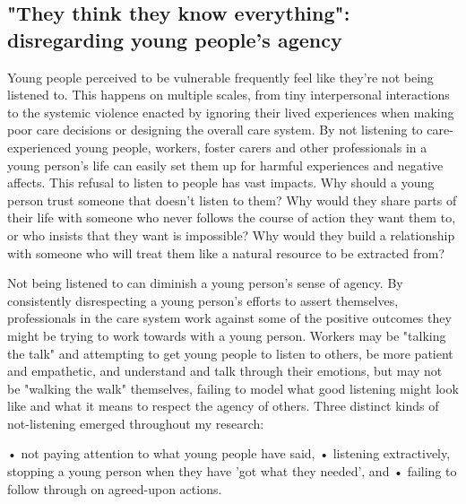 \subsection{"They think they know everything": disregarding young people's agency}
Young people perceived to be vulnerable frequently feel like they're not being listened to. This happens on multiple scales, from tiny interpersonal interactions to the systemic violence enacted by ignoring their lived experiences when making poor care decisions or designing the overall care system. By not listening to care-experienced young people, workers, foster carers and other professionals in a young person's life can easily set them up for harmful experiences and negative affects. This refusal to listen to people has vast impacts. Why should a young person trust someone that doesn't listen to them? Why would they share parts of their life with someone who never follows the course of action they want them to, or who insists that they want is impossible? Why would they build a relationship with someone who will treat them like a natural resource to be extracted from?

Not being listened to can diminish a young person's sense of agency. By consistently disrespecting a young person's efforts to assert themselves, professionals in the care system work against some of the positive outcomes they might be trying to work towards with a young person. Workers may be "talking the talk" and attempting to get young people to listen to others, be more patient and empathetic, and understand and talk through their emotions, but may not be "walking the walk" themselves, failing to model what good listening might look like and what it means to respect the agency of others. Three distinct kinds of not-listening emerged throughout my research:

•	not paying attention to what young people have said,
•	listening extractively, stopping a young person when they have 'got what they needed', and
•	failing to follow through on agreed-upon actions.

